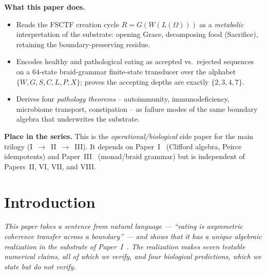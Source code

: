 \documentclass[11pt,a4paper]{article}
\theoremstyle{plain}
\theoremstyle{definition}
\theoremstyle{remark}
\numberwithin{equation}{section}
\providecommand{\Cl}{\mathrm{Cl}}
\providecommand{\R}{\mathbb{R}}
\newenvironment{sectionopener}
  {\begin{sectionopenerframe}\small\itshape\ignorespaces}
  {\end{sectionopenerframe}}
\begin{document}
\begin{abstract}
\medskip\noindent\textbf{Scope.} All proofs reduce to closed-form
algebra in $\Cl(3,1) \cong M_4(\R)$. The framework is a
re-reading, not a new physics; its empirical content lies in
specific biological predictions stated in §\ref{sec:predictions}.
\end{abstract}

\medskip
\noindent\textbf{What this paper does.}
\begin{itemize}[leftmargin=1.5em,nosep,topsep=2pt]
  \item Reads the FSCTF creation cycle
        $R = G(W(L(\Omega)))$ as a \emph{metabolic} interpretation
        of the substrate: opening Grace, decomposing food
        (Sacrifice), retaining the boundary-preserving residue.
  \item Encodes healthy and pathological eating as accepted vs.\
        rejected sequences on a $64$-state braid-grammar
        finite-state transducer over the alphabet $\{W,G,S,C,L,P,X\}$;
        proves the accepting depths are exactly $\{2,3,4,7\}$.
  \item Derives four \emph{pathology theorems}
        -- autoimmunity, immunodeficiency, microbiome transport,
        constipation -- as failure modes of the same boundary
        algebra that underwrites the substrate.
\end{itemize}

\medskip
\noindent\textbf{Place in the series.}
This is the \emph{operational/biological} side paper for the
main trilogy (I~$\to$~II~$\to$~III).  It depends on Paper~I~\cite{paper-I}
(Clifford algebra, Peirce idempotents) and Paper~III~\cite{paper-III} (monad/braid
grammar) but is independent of Papers~II, VI, VII, and VIII.

\tableofcontents
\clearpage

\section{Introduction}
\label{sec:intro}

\begin{sectionopener}
This paper takes a sentence from natural language --- ``eating is asymmetric
coherence transfer across a boundary'' --- and shows that it has a
unique algebraic realization in the substrate of Paper~I~\cite{paper-I}. The
realization makes seven testable numerical claims, all of which we
verify, and four biological predictions, which we state but do not
verify.
\end{sectionopener}
\end{document}
